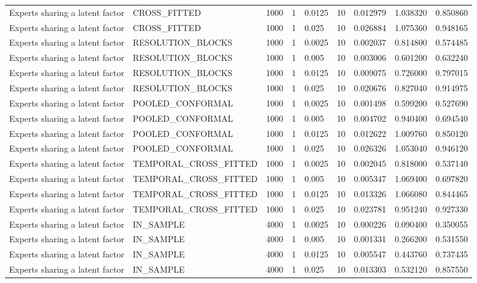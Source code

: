 \begin{tabular}{lllllllll}
Experts sharing a latent factor & CROSS\_FITTED & 1000 & 1 & 0.0125 & 10 & 0.012979 & 1.038320 & 0.850860 \\
Experts sharing a latent factor & CROSS\_FITTED & 1000 & 1 & 0.025 & 10 & 0.026884 & 1.075360 & 0.948165 \\
Experts sharing a latent factor & RESOLUTION\_BLOCKS & 1000 & 1 & 0.0025 & 10 & 0.002037 & 0.814800 & 0.574485 \\
Experts sharing a latent factor & RESOLUTION\_BLOCKS & 1000 & 1 & 0.005 & 10 & 0.003006 & 0.601200 & 0.632240 \\
Experts sharing a latent factor & RESOLUTION\_BLOCKS & 1000 & 1 & 0.0125 & 10 & 0.009075 & 0.726000 & 0.797015 \\
Experts sharing a latent factor & RESOLUTION\_BLOCKS & 1000 & 1 & 0.025 & 10 & 0.020676 & 0.827040 & 0.914975 \\
Experts sharing a latent factor & POOLED\_CONFORMAL & 1000 & 1 & 0.0025 & 10 & 0.001498 & 0.599200 & 0.527690 \\
Experts sharing a latent factor & POOLED\_CONFORMAL & 1000 & 1 & 0.005 & 10 & 0.004702 & 0.940400 & 0.694540 \\
Experts sharing a latent factor & POOLED\_CONFORMAL & 1000 & 1 & 0.0125 & 10 & 0.012622 & 1.009760 & 0.850120 \\
Experts sharing a latent factor & POOLED\_CONFORMAL & 1000 & 1 & 0.025 & 10 & 0.026326 & 1.053040 & 0.946120 \\
Experts sharing a latent factor & TEMPORAL\_CROSS\_FITTED & 1000 & 1 & 0.0025 & 10 & 0.002045 & 0.818000 & 0.537140 \\
Experts sharing a latent factor & TEMPORAL\_CROSS\_FITTED & 1000 & 1 & 0.005 & 10 & 0.005347 & 1.069400 & 0.697820 \\
Experts sharing a latent factor & TEMPORAL\_CROSS\_FITTED & 1000 & 1 & 0.0125 & 10 & 0.013326 & 1.066080 & 0.844465 \\
Experts sharing a latent factor & TEMPORAL\_CROSS\_FITTED & 1000 & 1 & 0.025 & 10 & 0.023781 & 0.951240 & 0.927330 \\
Experts sharing a latent factor & IN\_SAMPLE & 4000 & 1 & 0.0025 & 10 & 0.000226 & 0.090400 & 0.350055 \\
Experts sharing a latent factor & IN\_SAMPLE & 4000 & 1 & 0.005 & 10 & 0.001331 & 0.266200 & 0.531550 \\
Experts sharing a latent factor & IN\_SAMPLE & 4000 & 1 & 0.0125 & 10 & 0.005547 & 0.443760 & 0.737435 \\
Experts sharing a latent factor & IN\_SAMPLE & 4000 & 1 & 0.025 & 10 & 0.013303 & 0.532120 & 0.857550 \\

\end{tabular}
